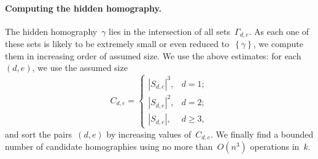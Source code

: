 \documentclass{amsart}
\let\realpar\paragraph
\def\paragraph#1{\realpar{\textbf{#1}}}
\def\acco#1{\left\{#1\right\}}
\def\abs#1{\left|#1\right|}
\def\card#1{\abs{#1}}
\begin{document}
\paragraph{Computing the hidden homography.}

The hidden homography~$γ$ lies in the intersection of all sets~$Γ_{d,e}$.
As each one of these sets is likely to be extremely small or even reduced
to~$\acco{γ}$, we compute them in increasing order of assumed size.
We use the above estimates: for each~$(d,e)$, we use the assumed size
\begin{equation}
C_{d,e} = \begin{cases}
\card{S_{d,e}}^3,& d = 1;\\
\card{S_{d,e}}^2,& d = 2;\\
\card{S_{d,e}},& d≥ 3,
\end{cases}
\end{equation}
and sort the pairs~$(d,e)$ by increasing values of~$C_{d,e}$. We finally
find a bounded number of candidate homographies using no more
than~$O(n^3)$ operations in~$k$.
\end{document}

